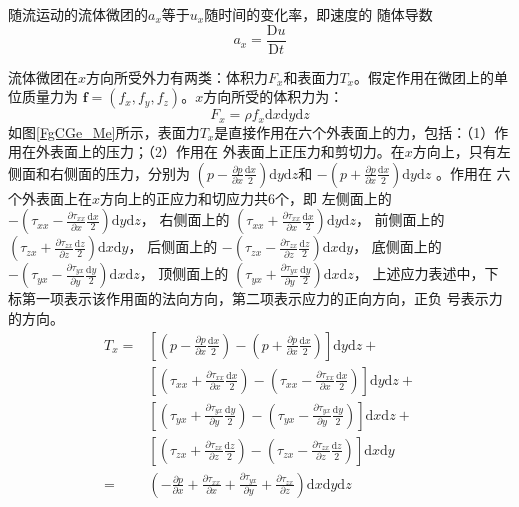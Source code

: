 随流运动的流体微团的$a_{x}$等于$u_{x}$随时间的变化率，即速度的
随体导数
\begin{equation}
  a_{x} =
  \frac{\mathrm{D}u}{\mathrm{D}t}
  \label{EqCGe_Ac_x}
\end{equation}

流体微团在$x$方向所受外力有两类：体积力$F_{x}$和表面力$T_{x}$。假定作用在微团上的单位质量力为
$\mathbf{f}=(f_{x}, f_{y}, f_{z})$。$x$方向所受的体积力为：
\begin{equation}
  F_{x} = \rho f_{x}\mathrm{d}x\mathrm{d}y\mathrm{d}z
  \label{EqCGe_Bf_x}
\end{equation}
如图\ref{FgCGe_Me}所示，表面力$T_{x}$是直接作用在六个外表面上的力，包括：（1）作用在外表面上的压力；（2）作用在
外表面上正压力和剪切力。在$x$方向上，只有左侧面和右侧面的压力，分别为
$(p-\frac{\partial p}{\partial x}\frac{\mathrm{d}x}{2})\mathrm{d}y\mathrm{d}z$和
$-(p+\frac{\partial p}{\partial x}\frac{\mathrm{d}x}{2})\mathrm{d}y\mathrm{d}z$
。作用在
六个外表面上在$x$方向上的正应力和切应力共6个，即
左侧面上的
$-(\tau_{xx}-\frac{\partial \tau_{xx}}{\partial x}\frac{\mathrm{d}x}{2})\mathrm{d}y\mathrm{d}z$，
右侧面上的
$(\tau_{xx}+\frac{\partial \tau_{xx}}{\partial x}\frac{\mathrm{d}x}{2})\mathrm{d}y\mathrm{d}z$，
前侧面上的
$(\tau_{zx}+\frac{\partial \tau_{zx}}{\partial z}\frac{\mathrm{d}z}{2})\mathrm{d}x\mathrm{d}y$，
后侧面上的
$-(\tau_{zx}-\frac{\partial \tau_{zx}}{\partial z}\frac{\mathrm{d}z}{2})\mathrm{d}x\mathrm{d}y$，
底侧面上的
$-(\tau_{yx}-\frac{\partial \tau_{yx}}{\partial y}\frac{\mathrm{d}y}{2})\mathrm{d}x\mathrm{d}z$，
顶侧面上的
$(\tau_{yx}+\frac{\partial \tau_{yx}}{\partial y}\frac{\mathrm{d}y}{2})\mathrm{d}x\mathrm{d}z$，
上述应力表述中，下标第一项表示该作用面的法向方向，第二项表示应力的正向方向，正负
号表示力的方向。
\begin{equation}
  \begin{aligned}
    T_{x} =&
    \left[
      \left(p-\frac{\partial p}{\partial x}\frac{\mathrm{d}x}{2}\right)
      -
      \left(p+\frac{\partial p}{\partial x}\frac{\mathrm{d}x}{2}\right)
    \right]\mathrm{d}y\mathrm{d}z 
    +
    \\
    &
    \left[
      \left(\tau_{xx}+\frac{\partial \tau_{xx}}{\partial x}\frac{\mathrm{d}x}{2}\right)
      -
      \left(\tau_{xx}-\frac{\partial \tau_{xx}}{\partial x}\frac{\mathrm{d}x}{2}\right)
    \right]
    \mathrm{d}y\mathrm{d}z +\\
    & 
    \left[
      \left(\tau_{yx}+\frac{\partial \tau_{yx}}{\partial y}\frac{\mathrm{d}y}{2}\right)
      -
      \left(\tau_{yx}-\frac{\partial \tau_{yx}}{\partial y}\frac{\mathrm{d}y}{2}\right)
    \right]
    \mathrm{d}x\mathrm{d}z
    + \\
    &\left[
      \left(\tau_{zx}+\frac{\partial \tau_{zx}}{\partial z}\frac{\mathrm{d}z}{2}\right)
      -
      \left(\tau_{zx}-\frac{\partial \tau_{zx}}{\partial z}\frac{\mathrm{d}z}{2}\right)
    \right]
    \mathrm{d}x\mathrm{d}y
    \\
    =&
    \left(
    -\frac{\partial p}{\partial x}
    +\frac{\partial \tau_{xx}}{\partial x}
    +\frac{\partial \tau_{yx}}{\partial y}
    +\frac{\partial \tau_{zx}}{\partial z}
    \right)
    \mathrm{d}x\mathrm{d}y\mathrm{d}z
  \end{aligned}
  \label{EqCGe_Sf_x}
\end{equation}
